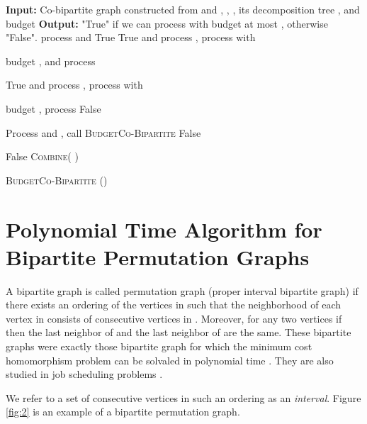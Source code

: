 \documentclass[letterpaper,11pt,abstracton]{scrartcl}
\begin{document}
\begin{algorithm}[H]
\begin{algorithmic}[1]
\State \textbf{Input:}  Co-bipartite graph  constructed from
 and , , , its decomposition tree , and budget \;
\State \textbf{Output:} "True" if we can process  with budget at most , otherwise "False".\;
 \label{firstIF-co}
 process  and \Return True\;
\EndIf
{}
	\If{  }
    	\Return True and process , process  with
    	
    	\hspace{3mm}  budget , and process \;
    	
    \ElsIf {  }
    	\Return True and process , process  with
    	
    	\hspace{3mm} budget , process \;
    \Else {} \Return False\;
    \EndIf
\EndIf 


  \State Process  and ,
     \State \Return call \textsc{BudgetCo-Bipartite}
     \;
\EndIf {}
\Return False\;
\EndIf


\Return False\;
\Else {} \Return \textsc{Combine}( )
\EndIf
\EndIf
\end{algorithmic}
\caption{{\textsc{BudgetCo-Bipartite}} ()}
\label{alg:co-bipartite}
\end{algorithm}



\section{Polynomial Time Algorithm for Bipartite Permutation Graphs}\label{sec:poly-permutation}
A bipartite graph  is called permutation graph (proper interval bipartite graph) if there exists an ordering 
of the vertices in  such that the neighborhood of each vertex in  consists of consecutive vertices in . Moreover, for any two
vertices  if  then the last neighbor of  and the last neighbor of  are the same.
These bipartite graphs were exactly those bipartite graph for which  the  minimum cost homomorphism problem can be solvaled in polynomial time \cite{GHRY08}. 
They are also studied  in job scheduling problems \cite{KKRS13,MS12}. 


We refer to a set of consecutive vertices in such an ordering as an \textit{interval}. Figure
\ref{fig:2} is an example of a bipartite permutation
graph.
\end{document}
